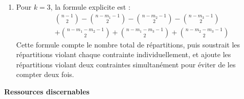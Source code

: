 \documentclass[10pt,a4paper]{article}
\begin{document}
\begin{enumerate}
      \item Pour $k=3$, la formule explicite est :
      \begin{align*}
      &\binom{n-1}{2} - \binom{n-m_1-1}{2} - \binom{n-m_2-1}{2} - \binom{n-m_3-1}{2} \\
      &+ \binom{n-m_1-m_2-1}{2} + \binom{n-m_1-m_3-1}{2} + \binom{n-m_2-m_3-1}{2}
      \end{align*}
      Cette formule compte le nombre total de répartitions, puis soustrait les répartitions violant
      chaque contrainte individuellement, et ajoute les répartitions violant deux contraintes
      simultanément pour éviter de les compter deux fois.

   \end{enumerate}

\q \textbf{Ressources discernables}
\end{document}
